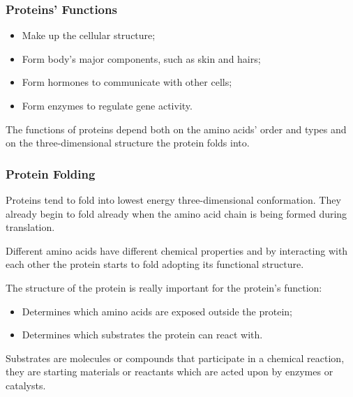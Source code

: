 \subsubsection{Proteins' Functions}
\begin{itemize}
	\item Make up the cellular structure;
	\item Form body's major components, such as skin and hairs;
	\item Form hormones to communicate with other cells;
	\item Form enzymes to regulate gene activity.
\end{itemize}

The functions of proteins depend both on the amino acids' order and types and on the three-dimensional structure the protein folds into.

\subsubsection{Protein Folding}
Proteins tend to fold into lowest energy three-dimensional conformation. They already begin to fold already when the amino acid chain is being formed during translation.

Different amino acids have different chemical properties and by interacting with each other the protein starts to fold adopting its functional structure.

The structure of the protein is really important for the protein's function:
\begin{itemize}
	\item Determines which amino acids are exposed outside the protein;
	\item Determines which substrates the protein can react with.
\end{itemize}

Substrates are molecules or compounds that participate in a chemical reaction, they are starting materials or reactants which are acted upon by enzymes or catalysts.
\vspace{6em}
\pagebreak

